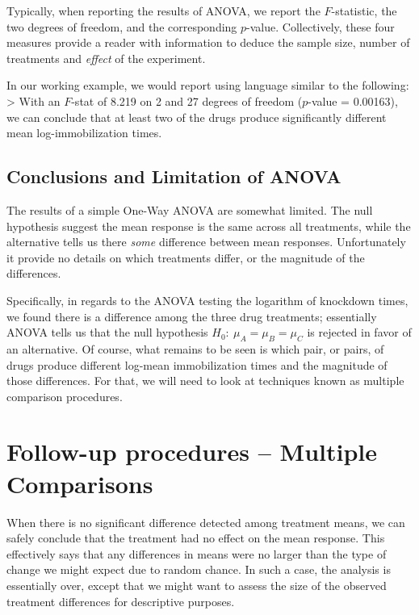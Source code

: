 \documentclass[
]{book}
\begin{document}
Typically, when reporting the results of ANOVA, we report the \(F\)-statistic, the two degrees of freedom, and the corresponding \(p\)-value.
Collectively, these four measures provide a reader with information to deduce the sample size, number of treatments and \emph{effect} of the experiment.

In our working example, we would report using language similar to the following:
\textgreater{} With an \(F\)-stat of 8.219 on 2 and 27 degrees of freedom (\(p\)-value = 0.00163), we can conclude that at least two of the drugs produce significantly different mean log-immobilization times.

\hypertarget{conclusions-and-limitation-of-anova}{%
\subsection{Conclusions and Limitation of ANOVA}\label{conclusions-and-limitation-of-anova}}

The results of a simple One-Way ANOVA are somewhat limited.
The null hypothesis suggest the mean response is the same across all treatments, while the alternative tells us there \emph{some} difference between mean responses.
Unfortunately it provide no details on which treatments differ, or the magnitude of the differences.

Specifically, in regards to the ANOVA testing the logarithm of knockdown times, we found there is a difference among the three drug treatments; essentially ANOVA tells us that the null hypothesis \(H_0:\ \mu_A = \mu_B = \mu_C\) is rejected in favor of an alternative.
Of course, what remains to be seen is which pair, or pairs, of drugs produce different log-mean immobilization times and the magnitude of those differences.
For that, we will need to look at techniques known as multiple comparison procedures.

\hypertarget{follow-up-procedures-multiple-comparisons}{%
\section{Follow-up procedures -- Multiple Comparisons}\label{follow-up-procedures-multiple-comparisons}}

When there is no significant difference detected among treatment means, we can safely conclude that the treatment had no effect on the mean response.
This effectively says that any differences in means were no larger than the type of change we might expect due to random chance.
In such a case, the analysis is essentially over, except that we might want to assess the size of the observed treatment differences for descriptive purposes.
\end{document}
